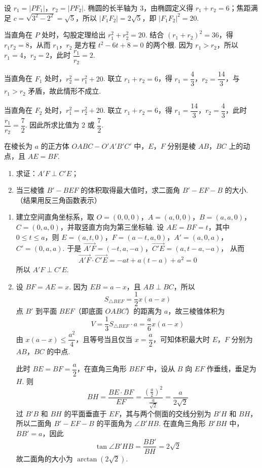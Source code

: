 \begin{solution}
设 \(r_1=|PF_1|\)，\(r_2=|PF_2|\). 椭圆的长半轴为 \(3\)，由椭圆定义得 \(r_1+r_2=6\)；焦距满足 \(c=\sqrt{3^2-2^2}=\sqrt{5}\)，所以 \(|F_1F_2|=2\sqrt{5}\)，即 \(|F_1F_2|^2=20\).

当直角在 \(P\) 处时，勾股定理给出 \(r_1^2+r_2^2=20\). 结合 \((r_1+r_2)^2=36\)，得 \(r_1r_2=8\)，从而 \(r_1\)，\(r_2\) 是方程 \(t^2-6t+8=0\) 的两个根. 因为 \(r_1>r_2\)，所以 \(r_1=4\)，\(r_2=2\)，此时 \(\dfrac{r_1}{r_2}=2\).

当直角在 \(F_1\) 处时，\(r_2^2=r_1^2+20\). 联立 \(r_1+r_2=6\)，得 \(r_1=\dfrac{4}{3}\)，\(r_2=\dfrac{14}{3}\)，与 \(r_1>r_2\) 矛盾，故此情形不成立.

当直角在 \(F_2\) 处时，\(r_1^2=r_2^2+20\). 联立 \(r_1+r_2=6\)，得 \(r_1=\dfrac{14}{3}\)，\(r_2=\dfrac{4}{3}\)，此时 \(\dfrac{r_1}{r_2}=\dfrac{7}{2}\). 因此所求比值为 \(2\) 或 \(\dfrac{7}{2}\).
\end{solution}

\begin{problem}
在棱长为 \(a\) 的正方体 \(OABC-O'A'B'C'\) 中，\(E\)，\(F\) 分别是棱 \(AB\)，\(BC\) 上的动点，且 \(AE=BF\).
\begin{enumerate}
\item 求证：\(A'F\perp C'E\)；
\item 当三棱锥 \(B'-BEF\) 的体积取得最大值时，求二面角 \(B'-EF-B\) 的大小.（结果用反三角函数表示）
\end{enumerate}
\end{problem}

\begin{solution}
\begin{enumerate}
\item 建立空间直角坐标系，取 \(O=(0,0,0)\)，\(A=(a,0,0)\)，\(B=(a,a,0)\)，\(C=(0,a,0)\)，并取竖直方向为第三坐标轴. 设 \(AE=BF=t\)，其中 \(0\leqslant t\leqslant a\)，则
\(E=(a,t,0)\)，\(F=(a-t,a,0)\)，\(A'=(a,0,a)\)，\(C'=(0,a,a)\).
于是
\(\overrightarrow{A'F}=(-t,a,-a)\)，\(\overrightarrow{C'E}=(a,t-a,-a)\)，
从而
\[
\overrightarrow{A'F}\cdot\overrightarrow{C'E}=-at+a(t-a)+a^2=0
\]
所以 \(A'F\perp C'E\).
\item 设 \(BF=AE=x\). 因为 \(EB=a-x\)，且 \(AB\perp BC\)，所以
\[
S_{\triangle BEF}=\frac{1}{2}x(a-x)
\]
点 \(B'\) 到平面 \(BEF\)（即底面 \(OABC\)）的距离为 \(a\)，故三棱锥体积为
\[
V=\frac{1}{3}S_{\triangle BEF}\cdot a=\frac{a}{6}x(a-x)
\]
由 \(x(a-x)\leqslant\dfrac{a^2}{4}\)，且等号当且仅当 \(x=\dfrac{a}{2}\)，可知体积最大时 \(E\)，\(F\) 分别为 \(AB\)，\(BC\) 的中点.

此时 \(BE=BF=\dfrac{a}{2}\)，在直角三角形 \(BEF\) 中，设从 \(B\) 向 \(EF\) 作垂线，垂足为 \(H\). 则
\[
BH=\frac{BE\cdot BF}{EF}=\frac{(\frac{a}{2})^2}{\frac{a}{\sqrt{2}}}=\frac{a}{2\sqrt{2}}
\]
过 \(B'B\) 和 \(BH\) 的平面垂直于 \(EF\)，其与两个侧面的交线分别为 \(B'H\) 和 \(BH\)，所以二面角 \(B'-EF-B\) 的平面角为 \(\angle B'HB\). 在直角三角形 \(B'BH\) 中，\(BB'=a\)，因此
\[
\tan\angle B'HB=\frac{BB'}{BH}=2\sqrt{2}
\]
故二面角的大小为 \(\arctan\left(2\sqrt{2}\right)\).
\end{enumerate}
\end{solution}

